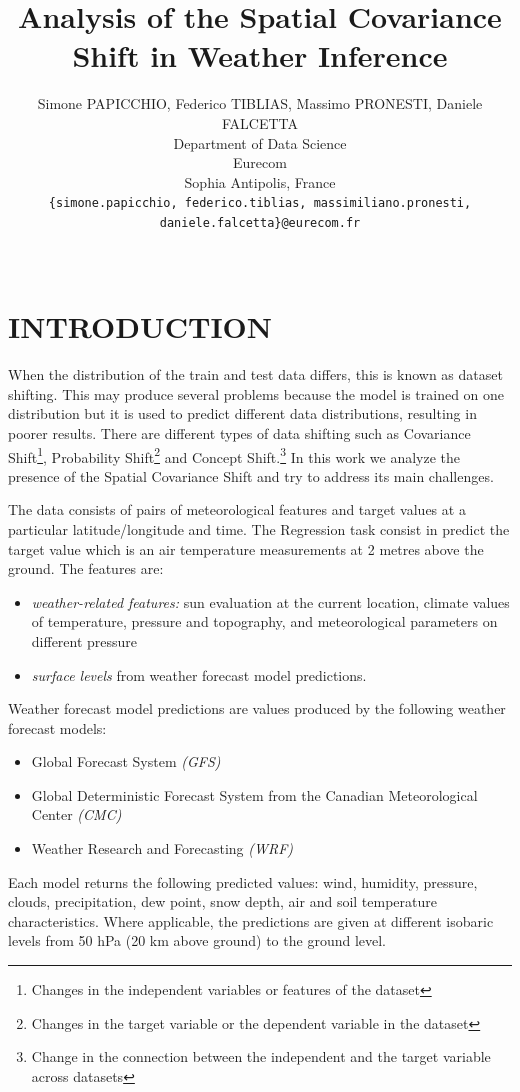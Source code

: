 \documentclass[letterpaper, 10 pt, conference]{ieeeconf}
\title{\LARGE \bf
Analysis of the Spatial Covariance Shift in Weather Inference
}
\author{Simone PAPICCHIO, Federico TIBLIAS, Massimo PRONESTI, Daniele FALCETTA%
\\ Department of Data Science \\
Eurecom \\
Sophia Antipolis, France\\
{\tt\small\{simone.papicchio, federico.tiblias, massimiliano.pronesti, daniele.falcetta\}@eurecom.fr} \\ \\
}
\begin{document}
    \maketitle
    \thispagestyle{plain}
    \pagestyle{plain}


\section{INTRODUCTION}
    When the distribution of the train and test data differs, this is known as dataset shifting. This may produce several problems because the model is trained on one distribution but it is used to predict different data distributions, resulting in poorer results. There are different types of data shifting such as 
    Covariance Shift\footnote{Changes in the independent variables or features of the dataset},
    Probability Shift\footnote{Changes in the target variable or the dependent variable in the dataset}
    and Concept Shift.\footnote{Change in the connection between the independent and the target variable across datasets}
    In this work we analyze the presence of the Spatial Covariance Shift and try to address its main challenges.

    The data consists of pairs of meteorological features and target values at a particular latitude/longitude and time.
    The Regression task consist in predict the target value which is an air temperature measurements at 2 metres above the ground.
    The features are:
    \begin{itemize}
        \item \textit{weather-related features:} sun evaluation at the current location, climate values of temperature, pressure and topography, and meteorological parameters on different pressure
        \item \textit{surface levels} from weather forecast model predictions.
    \end{itemize} 
    Weather forecast model predictions are values produced by the following weather forecast models: 

    \begin{itemize}
        \item Global Forecast System \textit{(GFS)}
        \item Global Deterministic Forecast System from the Canadian Meteorological Center \textit{(CMC)}
        \item Weather Research and Forecasting \textit{(WRF) }
    \end{itemize}
    Each model returns the following predicted values: wind, humidity, pressure, clouds, precipitation, dew point, snow depth, air and soil temperature characteristics. Where applicable, the predictions are given at different isobaric levels from 50 hPa (20 km above ground) to the ground level.
\end{document}
